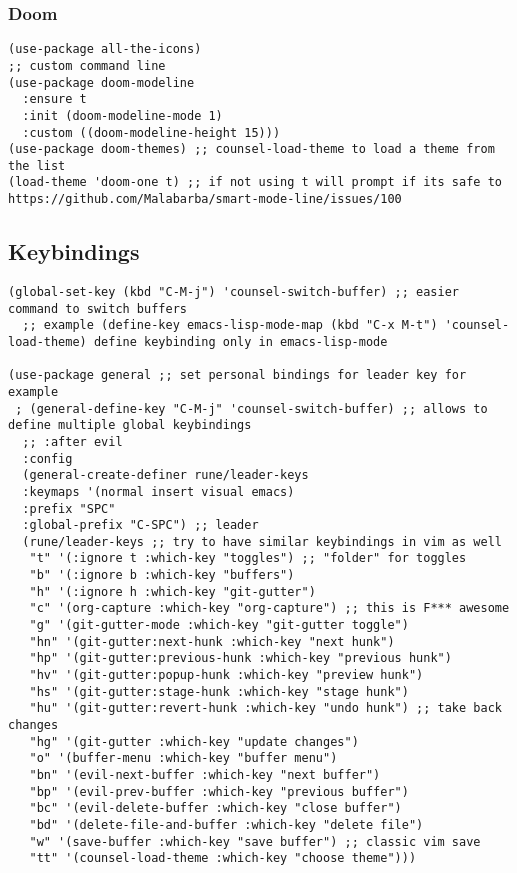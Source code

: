 \documentclass[11pt]{article}
\begin{document}
\subsubsection{Doom}
\label{sec:orgaddaf39}
\begin{verbatim}
(use-package all-the-icons)
;; custom command line
(use-package doom-modeline
  :ensure t
  :init (doom-modeline-mode 1)
  :custom ((doom-modeline-height 15)))
(use-package doom-themes) ;; counsel-load-theme to load a theme from the list
(load-theme 'doom-one t) ;; if not using t will prompt if its safe to https://github.com/Malabarba/smart-mode-line/issues/100
\end{verbatim}
\subsection{Keybindings}
\label{sec:org5342b17}
\begin{verbatim}
(global-set-key (kbd "C-M-j") 'counsel-switch-buffer) ;; easier command to switch buffers
  ;; example (define-key emacs-lisp-mode-map (kbd "C-x M-t") 'counsel-load-theme) define keybinding only in emacs-lisp-mode

(use-package general ;; set personal bindings for leader key for example
 ; (general-define-key "C-M-j" 'counsel-switch-buffer) ;; allows to define multiple global keybindings
  ;; :after evil
  :config
  (general-create-definer rune/leader-keys
  :keymaps '(normal insert visual emacs)
  :prefix "SPC" 
  :global-prefix "C-SPC") ;; leader
  (rune/leader-keys ;; try to have similar keybindings in vim as well
   "t" '(:ignore t :which-key "toggles") ;; "folder" for toggles
   "b" '(:ignore b :which-key "buffers") 
   "h" '(:ignore h :which-key "git-gutter") 
   "c" '(org-capture :which-key "org-capture") ;; this is F*** awesome
   "g" '(git-gutter-mode :which-key "git-gutter toggle") 
   "hn" '(git-gutter:next-hunk :which-key "next hunk") 
   "hp" '(git-gutter:previous-hunk :which-key "previous hunk") 
   "hv" '(git-gutter:popup-hunk :which-key "preview hunk") 
   "hs" '(git-gutter:stage-hunk :which-key "stage hunk") 
   "hu" '(git-gutter:revert-hunk :which-key "undo hunk") ;; take back changes
   "hg" '(git-gutter :which-key "update changes") 
   "o" '(buffer-menu :which-key "buffer menu") 
   "bn" '(evil-next-buffer :which-key "next buffer") 
   "bp" '(evil-prev-buffer :which-key "previous buffer")
   "bc" '(evil-delete-buffer :which-key "close buffer")
   "bd" '(delete-file-and-buffer :which-key "delete file")
   "w" '(save-buffer :which-key "save buffer") ;; classic vim save
   "tt" '(counsel-load-theme :which-key "choose theme")))
\end{verbatim}
\end{document}
